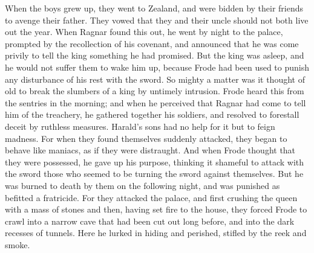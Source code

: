 \documentclass[10pt,a4paper]{report}
\begin{document}
When the boys grew up, they went to Zealand, and were bidden by their friends to avenge their father. They vowed that they and their uncle should not both live out the year. When Ragnar found this out, he went by night to the palace, prompted by the recollection of his covenant, and announced that he was come privily to tell the king something he had promised. But the king was asleep, and he would not suffer them to wake him up, because Frode had been used to punish any disturbance of his rest with the sword. So mighty a matter was it thought of old to break the slumbers of a king by untimely intrusion. Frode heard this from the sentries in the morning; and when he perceived that Ragnar had come to tell him of the treachery, he gathered together his soldiers, and resolved to forestall deceit by ruthless measures. Harald's sons had no help for it but to feign madness. For when they found themselves suddenly attacked, they began to behave like maniacs, as if they were distraught. And when Frode thought that they were possessed, he gave up his purpose, thinking it shameful to attack with the sword those who seemed to be turning the sword against themselves. But he was burned to death by them on the following night, and was punished as befitted a fratricide. For they attacked the palace, and first crushing the queen with a mass of stones and then, having set fire to the house, they forced Frode to crawl into a narrow cave that had been cut out long before, and into the dark recesses of tunnels. Here he lurked in hiding and perished, stifled by the reek and smoke.\\
\end{document}
